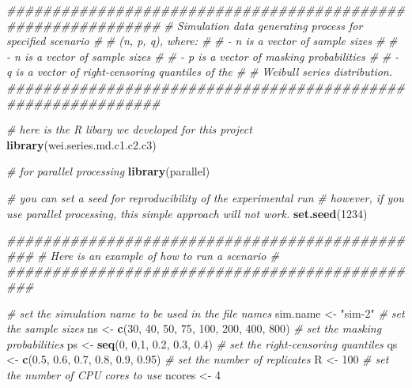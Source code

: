 \documentclass[
]{article}
\newenvironment{Shaded}{\begin{snugshade}}{\end{snugshade}}
\newcommand{\CommentTok}[1]{\textcolor[rgb]{0.56,0.35,0.01}{\textit{#1}}}
\newcommand{\DecValTok}[1]{\textcolor[rgb]{0.00,0.00,0.81}{#1}}
\newcommand{\FloatTok}[1]{\textcolor[rgb]{0.00,0.00,0.81}{#1}}
\newcommand{\KeywordTok}[1]{\textcolor[rgb]{0.13,0.29,0.53}{\textbf{#1}}}
\newcommand{\NormalTok}[1]{#1}
\newcommand{\StringTok}[1]{\textcolor[rgb]{0.31,0.60,0.02}{#1}}
\begin{document}
\begin{Shaded}
\begin{Highlighting}[]
\CommentTok{\#\#\#\#\#\#\#\#\#\#\#\#\#\#\#\#\#\#\#\#\#\#\#\#\#\#\#\#\#\#\#\#\#\#\#\#\#\#\#\#\#\#\#\#\#\#\#\#\#\#\#\#\#\#\#\#\#\#\#\#\#}
\CommentTok{\# Simulation data generating process for specified scenario \#}
\CommentTok{\# (n, p, q), where:                                         \#}
\CommentTok{\#    {-} n is a vector of sample sizes                        \#}
\CommentTok{\#     {-} n is a vector of sample sizes                       \#}
\CommentTok{\#     {-} p is a vector of masking probabilities              \#}
\CommentTok{\#     {-} q is a vector of right{-}censoring quantiles of the   \#}
\CommentTok{\#       Weibull series distribution.}
\CommentTok{\#\#\#\#\#\#\#\#\#\#\#\#\#\#\#\#\#\#\#\#\#\#\#\#\#\#\#\#\#\#\#\#\#\#\#\#\#\#\#\#\#\#\#\#\#\#\#\#\#\#\#\#\#\#\#\#\#\#\#\#\#}

\CommentTok{\# here is the R libary we developed for this project}
\KeywordTok{library}\NormalTok{(wei.series.md.c1.c2.c3) }

\CommentTok{\# for parallel processing}
\KeywordTok{library}\NormalTok{(parallel)}

\CommentTok{\# you can set a seed for reproducibility of the experimental run}
\CommentTok{\# however, if you use parallel processing, this simple approach will not work.}
\KeywordTok{set.seed}\NormalTok{(}\DecValTok{1234}\NormalTok{)}

\CommentTok{\#\#\#\#\#\#\#\#\#\#\#\#\#\#\#\#\#\#\#\#\#\#\#\#\#\#\#\#\#\#\#\#\#\#\#\#\#\#\#\#\#\#\#\#\#\#\#}
\CommentTok{\# Here is an example of how to run a scenario \#}
\CommentTok{\#\#\#\#\#\#\#\#\#\#\#\#\#\#\#\#\#\#\#\#\#\#\#\#\#\#\#\#\#\#\#\#\#\#\#\#\#\#\#\#\#\#\#\#\#\#\#}

\CommentTok{\# set the simulation name to be used in the file names}
\NormalTok{sim.name \textless{}{-}}\StringTok{ "sim{-}2"}
\CommentTok{\# set the sample sizes}
\NormalTok{ns \textless{}{-}}\StringTok{ }\KeywordTok{c}\NormalTok{(}\DecValTok{30}\NormalTok{, }\DecValTok{40}\NormalTok{, }\DecValTok{50}\NormalTok{, }\DecValTok{75}\NormalTok{, }\DecValTok{100}\NormalTok{, }\DecValTok{200}\NormalTok{, }\DecValTok{400}\NormalTok{, }\DecValTok{800}\NormalTok{)}
\CommentTok{\# set the masking probabilities}
\NormalTok{ps \textless{}{-}}\StringTok{ }\KeywordTok{seq}\NormalTok{(}\DecValTok{0}\NormalTok{, }\DecValTok{0}\NormalTok{,}\DecValTok{1}\NormalTok{, }\FloatTok{0.2}\NormalTok{, }\FloatTok{0.3}\NormalTok{, }\FloatTok{0.4}\NormalTok{)}
\CommentTok{\# set the right{-}censoring quantiles}
\NormalTok{qs \textless{}{-}}\StringTok{ }\KeywordTok{c}\NormalTok{(}\FloatTok{0.5}\NormalTok{, }\FloatTok{0.6}\NormalTok{, }\FloatTok{0.7}\NormalTok{, }\FloatTok{0.8}\NormalTok{, }\FloatTok{0.9}\NormalTok{, }\FloatTok{0.95}\NormalTok{)}
\CommentTok{\# set the number of replicates}
\NormalTok{R \textless{}{-}}\StringTok{ }\DecValTok{100}
\CommentTok{\# set the number of CPU cores to use}
\NormalTok{ncores \textless{}{-}}\StringTok{ }\DecValTok{4}


\end{Highlighting}
\end{Shaded}
\end{document}

